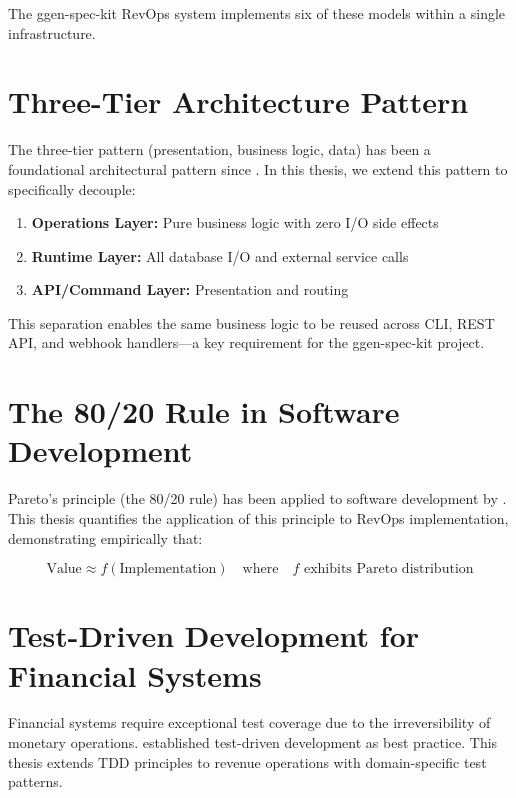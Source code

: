 \documentclass[12pt]{report}
\begin{document}
The ggen-spec-kit RevOps system implements six of these models within a single infrastructure.

\section{Three-Tier Architecture Pattern}

The three-tier pattern (presentation, business logic, data) has been a foundational architectural pattern since \cite{evans2003domain}. In this thesis, we extend this pattern to specifically decouple:

\begin{enumerate}
    \item \textbf{Operations Layer:} Pure business logic with zero I/O side effects
    \item \textbf{Runtime Layer:} All database I/O and external service calls
    \item \textbf{API/Command Layer:} Presentation and routing
\end{enumerate}

This separation enables the same business logic to be reused across CLI, REST API, and webhook handlers---a key requirement for the ggen-spec-kit project.

\section{The 80/20 Rule in Software Development}

Pareto's principle (the 80/20 rule) has been applied to software development by \cite{mcconnell2004code}. This thesis quantifies the application of this principle to RevOps implementation, demonstrating empirically that:

\begin{equation}
\text{Value} \approx f(\text{Implementation}) \quad \text{where} \quad f \text{ exhibits Pareto distribution}
\end{equation}

\section{Test-Driven Development for Financial Systems}

Financial systems require exceptional test coverage due to the irreversibility of monetary operations. \cite{beck2002test} established test-driven development as best practice. This thesis extends TDD principles to revenue operations with domain-specific test patterns.
\end{document}
